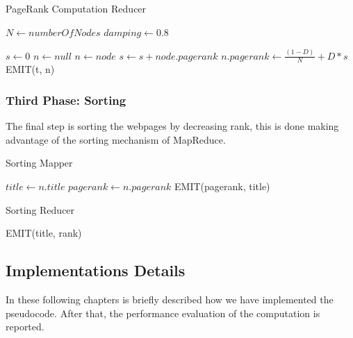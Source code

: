 \begin{algorithm}[H]
	\caption{PageRank Computation Reducer}\label{Reducer}
		\begin{algorithmic}[1]
				\State $N \gets numberOfNodes$
				\State $damping \gets 0.8$
			\EndProcedure
		
			\State $s \gets 0$
			\State $n \gets null$
					\State $n \gets node$
				\Else
					\State $s \gets s + node.pagerank$
				\EndIf
			\EndFor
				\State$n.pagerank \gets  \frac{(1-D)}{N} + D*s$
				\State EMIT(t, n)
			\EndIf
			\EndProcedure
	\end{algorithmic}
\end{algorithm}



\subsubsection{Third Phase: Sorting}
The final step is sorting the webpages by decreasing rank, this is done making advantage of the sorting mechanism of MapReduce.

\begin{algorithm}[H]
	\caption{Sorting Mapper}\label{Mapper}
	\begin{algorithmic}[1]
		\State $title \gets n.title$
		\State $pagerank \gets n.pagerank$
		\State EMIT(pagerank, title)
		\EndProcedure
	\end{algorithmic}
\end{algorithm}

\begin{algorithm}[H]
	\caption{Sorting Reducer}\label{Reducer}
	\begin{algorithmic}[1]
		\State EMIT(title, rank)
		\EndFor
		\EndProcedure
	\end{algorithmic}
\end{algorithm}

\subsection{Implementations Details}
In these following chapters is briefly described how we have implemented the pseudocode. After that, the performance evaluation of the computation is reported.

